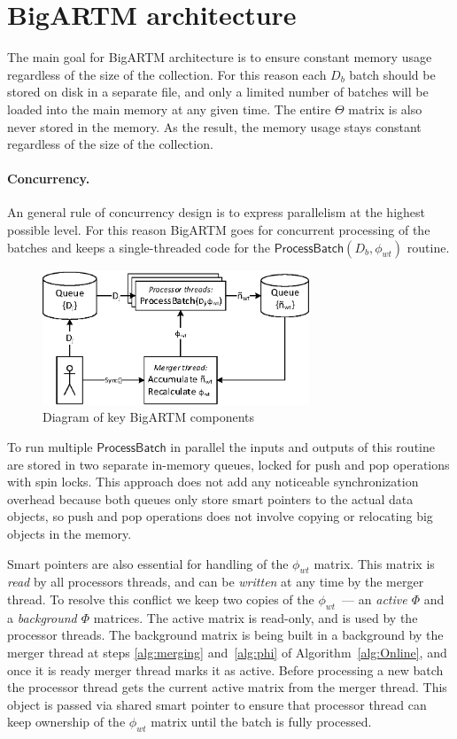 \documentclass{llncs}
\newcommand{\kw}[1]{\textsf{#1}}
\begin{document}
\section{BigARTM architecture}
\label{sec:BigARTM}

The main goal for BigARTM architecture is to ensure constant memory usage regardless of the size of the collection.
For this reason each $D_b$ batch should be stored on disk in a separate file,
and only a limited number of batches will be loaded into the main memory at any given time.
The entire $\Theta$ matrix is also never stored in the memory.
As the result, the memory usage stays constant regardless of the size of the collection.

\paragraph{Concurrency.}
An general rule of concurrency design is to express parallelism at the highest possible level.
For this reason BigARTM goes for concurrent processing of the batches
and keeps a single-threaded code for the $\kw{ProcessBatch}(D_b, \phi_{wt})$ routine.

\begin{figure}[h!]
\begin{centering}
\includegraphics[height=40mm]{diagramm_artm_core.eps}
\caption{Diagram of key BigARTM components}
\label{fig:diagramm_artm_core}
\end{centering}
\end{figure}

To run multiple $\kw{ProcessBatch}$ in parallel the inputs and outputs of this routine are stored in two separate in-memory queues,
locked for push and pop operations with spin locks.
This approach does not add any noticeable synchronization overhead because
both queues only store smart pointers to the actual data objects,
so push and pop operations does not involve copying or relocating big objects in the memory.

Smart pointers are also essential for handling of the $\phi_{wt}$ matrix.
This matrix is \emph{read} by all processors threads, and can be \emph{written} at any time by the merger thread.
To resolve this conflict we keep two copies of the $\phi_{wt}$~--- an \emph{active $\Phi$} and a \emph{background $\Phi$} matrices.
The active matrix is read-only, and is used by the processor threads.
The background matrix is being built in a background by the merger thread
at steps \ref{alg:merging} and~\ref{alg:phi} of Algorithm~\ref{alg:Online},
and once it is ready merger thread marks it as active.
Before processing a new batch the processor thread gets the current active matrix from the merger thread.
This object is passed via shared smart pointer to ensure that processor thread can keep ownership of the $\phi_{wt}$ matrix
until the batch is fully processed.
\end{document}
